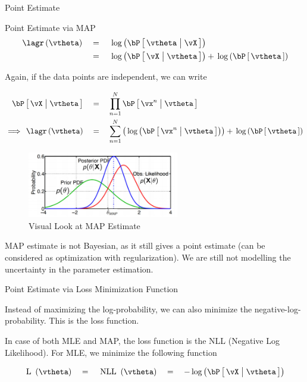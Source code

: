 \documentclass{article}
\begin{document}
\begin{ssection}{Point Estimate}
\begin{ssubsection}{Point Estimate via MAP}
		\begin{align*}
			\func{\lagr}{\vtheta}	&\eq	\log{\prob{\vtheta \pipe \vX}} \\
									&\eq	\log{\prob{\vX \pipe \vtheta}} + \log{\prob{\vtheta}}
		\end{align*}

		Again, if the data points are independent, we can write

		\begin{align*}
			\prob{\vX \pipe \vtheta}		&\eq	\prod_{n = 1}^N \prob{\vx^n \pipe \vtheta} \\
			\implies \func{\lagr}{\vtheta}	&\eq	\sum_{n = 1}^N \para{\log{\prob{\vx^n \pipe \vtheta}}} + \log{\prob{\vtheta}}
		\end{align*}

		\begin{figure}[h!]
			\centering
			\includegraphics[width=250px]{includes/scribe02/map-estimate.png}
			\caption{Visual Look at MAP Estimate}
		\end{figure}


		MAP estimate is not Bayesian, as it still gives a point estimate (can be considered as optimization with regularization). We are still not modelling the uncertainty in the parameter estimation.

	\end{ssubsection}

	\begin{ssubsection}{Point Estimate via Loss Minimization Function}

		Instead of maximizing the log-probability, we can also minimize the negative-log-probability. This is the loss function. \br

		In case of both MLE and MAP, the loss function is the NLL (Negative Log Likelihood). For MLE, we minimize the following function

		\begin{align*}
			\func{\mt{L}}{\vtheta}	\eq	\func{\mt{NLL}}{\vtheta}	\eq	-\log{\prob{\vX \pipe \vtheta}}
		\end{align*}


\end{ssubsection}
\end{ssection}
\end{document}
